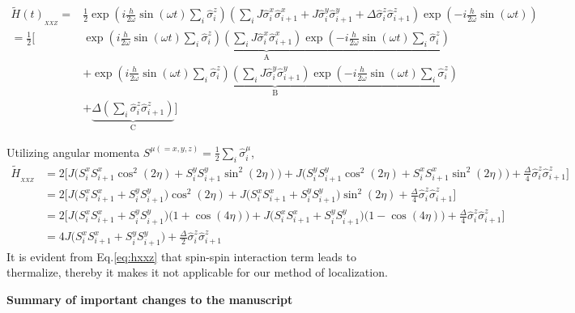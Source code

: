 \documentclass[aps,prb,reprint,showpacs,floatfix,superscriptaddress, onecolumn, nofootinbib, 9pt]{revtex4-2}
\begin{document}
\begin{enumerate}
{			\begin{align}
				\tilde{H}(t)_{_{XXZ}}= & \frac{1}{2} \exp \left(i \frac{h}{2 \omega} \sin (\omega t) \sum_{i} \hat{\sigma}_{i}^{z}\right)\left(\sum_{i} J \hat{\sigma}^x_i \hat{\sigma}^x_{i+1} + J \hat{\sigma}^y_i \hat{\sigma}^y_{i+1}+ \Delta  \hat{\sigma}^z_i \hat{\sigma}^z_{i+1}\right) \exp \left(-i \frac{h}{2 \omega} \sin (\omega t)\right)\nonumber\\
				= \frac12 \Bigg[& \underbrace{\exp \left(i \frac{h}{2 \omega} \sin (\omega t) \sum_{i} \hat{\sigma}_{i}^{z}\right)\left(\sum_{i} J \hat{\sigma}_{i}^{x} \hat{\sigma}_{i+1}^{x}\right) \exp \left(-i \frac{h}{2 \omega} \sin (\omega t) \sum_i\hat{\sigma}_{i}^{z}\right)}_{\mathrm{A}} \nonumber\\
				& +\underbrace{\exp \left(i \frac{h}{2 \omega} \sin (\omega t) \sum_{i} \hat{\sigma}_{i}^{z}\right)\left(\sum_{i} J \hat{\sigma}_{i}^{y} \hat{\sigma}_{i+1}^{y}\right) \exp \left(-i \frac{h}{2 \omega} \sin (\omega t) \sum_i\hat{\sigma}_{i}^{z}\right)}_{\mathrm{B}} \nonumber\\
				& +\underbrace{\Delta \left(\sum_{i}  \hat{\sigma}_{i}^{z} \hat{\sigma}_{i+1}^{z}\right)}_{\mathrm{C}}\Bigg]
				\label{eq:xxz1}
			\end{align}
		
		Utilizing angular momenta $\displaystyle S^{\mu(=x,y,z)} = \frac12\sum_i \hat{\sigma}^\mu_i$, 
		\begin{align}
		\tilde{H}_{_{XXZ}} &= 2\Bigg[J\Big(S^x_i S^x_{i+1}\cos^2(2\eta) + S^y_i S^y_{i+1}\sin^2(2\eta)\Big) + J\Big(S^y_i S^y_{i+1}\cos^2(2\eta) + S^x_i S^x_{i+1}\sin^2(2\eta)\Big) + \frac{\Delta}{4}\hat{\sigma}_{i}^{z} \hat{\sigma}_{i+1}^{z}\Bigg] \nonumber\\
		&= 2\Bigg[J\Big(S^x_i S^x_{i+1} + S^y_i S^y_{i+1}\Big)\cos^2(2\eta) + J\Big(S^x_i S^x_{i+1} + S^y_i S^y_{i+1}\Big)\sin^2(2\eta) + \frac{\Delta}{4}\hat{\sigma}_{i}^{z} \hat{\sigma}_{i+1}^{z}\Bigg]\nonumber\\
		&= 2\Bigg[J\Big(S^x_i S^x_{i+1} + S^y_i S^y_{i+1}\Big)\big(1+\cos(4\eta)\big) + J\Big(S^x_i S^x_{i+1} + S^y_i S^y_{i+1}\Big)\big(1-\cos(4\eta)\big) + \frac{\Delta}{4}\hat{\sigma}_{i}^{z} \hat{\sigma}_{i+1}^{z}\Bigg]\nonumber\\
		&= 4J\Big(S^x_i S^x_{i+1} + S^y_i S^y_{i+1}\Big) + \frac{\Delta}{2}\hat{\sigma}_{i}^{z} \hat{\sigma}_{i+1}^{z}
		\label{eq:hxxz}
		\end{align}
		It is evident from Eq.\eqref{eq:hxxz} that spin-spin interaction term leads to thermalize, thereby it makes it not applicable for our method of localization.
		}
	\end{enumerate}
	\vskip 1cm 
	\noindent \textbf{Summary of important changes to the  manuscript}
	
\end{document}
